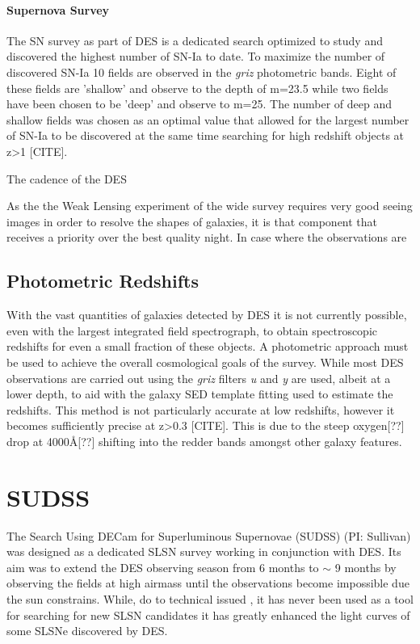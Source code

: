 \paragraph{Supernova Survey}
The SN survey as part of DES is a dedicated search optimized to study and discovered the highest number of SN-Ia to date. To maximize the number of discovered SN-Ia 10 fields are observed in the \textit{griz} photometric bands. Eight of these fields are 'shallow' and observe to the depth of m=23.5 while two fields have been chosen to be 'deep' and observe to m=25. The number of deep and shallow fields was chosen as an optimal value that allowed for the largest number of SN-Ia to be discovered at the same time searching for high redshift objects at z>1 [CITE].

The cadence of the DES

As the the Weak Lensing experiment of the wide survey requires very good seeing images in order to resolve the shapes of galaxies, it is that component that receives a priority over the best quality night. In case where the observations are

\subsection{Photometric Redshifts}
With the vast quantities of galaxies detected by DES it is not currently possible, even with the largest integrated field spectrograph, to obtain spectroscopic redshifts for even a small fraction of these objects. A photometric approach must be used to achieve the overall cosmological goals of the survey. While most DES observations are carried out using the \textit{griz} filters \textit{u} and \textit{y} are used, albeit at a lower depth, to aid with the galaxy SED template fitting used to estimate the redshifts. This method is not particularly accurate at low redshifts, however it becomes sufficiently precise at z>0.3 [CITE]. This is due to the steep oxygen[??] drop at 4000\AA [??] shifting into the redder bands amongst other galaxy features.


\section{SUDSS}
The Search Using DECam for Superluminous Supernovae (SUDSS) (PI: Sullivan) was designed as a dedicated SLSN survey working in conjunction with DES. Its aim was to extend the DES observing season from 6 months to $\sim$ 9 months by observing the fields at high airmass until the observations become impossible due the sun constrains. While, do to technical issued , it has never been used as a tool for searching for new SLSN candidates it has greatly enhanced the light curves of some SLSNe discovered by DES.

